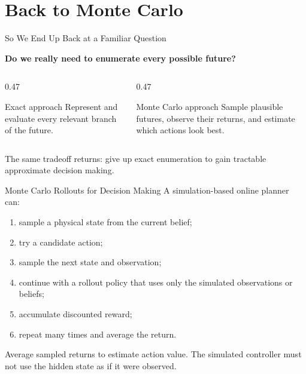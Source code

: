 \documentclass[aspectratio=169,10pt]{beamer}
\begin{document}
\section{Back to Monte Carlo}

\begin{frame}[shrink=10]{So We End Up Back at a Familiar Question}
  \begin{center}
    \Large\textbf{Do we really need to enumerate every possible future?}
  \end{center}

  \begin{columns}[T,onlytextwidth]
    \begin{column}{0.47\textwidth}
      \begin{block}{Exact approach}
        Represent and evaluate every relevant branch of the future.
      \end{block}
    \end{column}
    \begin{column}{0.47\textwidth}
      \begin{block}{Monte Carlo approach}
        Sample plausible futures, observe their returns, and estimate which actions look best.
      \end{block}
    \end{column}
  \end{columns}

  \begin{keyidea}
    The same tradeoff returns: give up exact enumeration to gain tractable approximate decision making.
  \end{keyidea}
\end{frame}

\begin{frame}[shrink=10]{Monte Carlo Rollouts for Decision Making}
  A simulation-based online planner can:
  \begin{enumerate}
    \item sample a physical state from the current belief;
    \item try a candidate action;
    \item sample the next state and observation;
    \item continue with a rollout policy that uses only the simulated observations or beliefs;
    \item accumulate discounted reward;
    \item repeat many times and average the return.
  \end{enumerate}

  \begin{keyidea}
    Average sampled returns to estimate action value. The simulated controller must not use the hidden state as if it were observed.
  \end{keyidea}
\end{frame}
\end{document}

